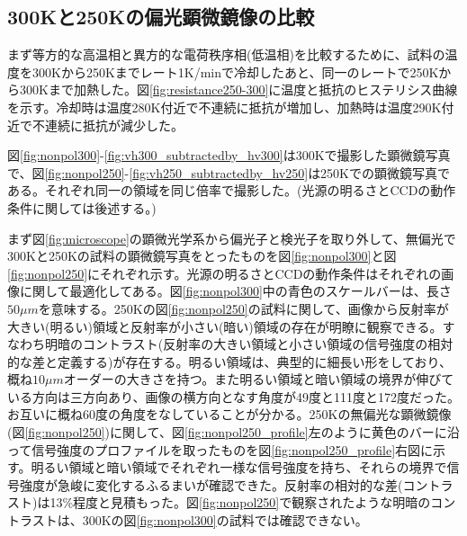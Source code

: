 \documentclass[11pt,a4paper]{jsarticle}
\begin{document}
\subsection{300Kと250Kの偏光顕微鏡像の比較}
まず等方的な高温相と異方的な電荷秩序相(低温相)を比較するために、試料の温度を300Kから250Kまでレート1K/minで冷却したあと、同一のレートで250Kから300Kまで加熱した。図\ref{fig:resistance250-300}に温度と抵抗のヒステリシス曲線を示す。冷却時は温度280K付近で不連続に抵抗が増加し、加熱時は温度290K付近で不連続に抵抗が減少した。

図\ref{fig:nonpol300}-\ref{fig:vh300_subtractedby_hv300}は300Kで撮影した顕微鏡写真で、図\ref{fig:nonpol250}-\ref{fig:vh250_subtractedby_hv250}は250Kでの顕微鏡写真である。それぞれ同一の領域を同じ倍率で撮影した。(光源の明るさとCCDの動作条件に関しては後述する。)

まず図\ref{fig:microscope}の顕微光学系から偏光子と検光子を取り外して、無偏光で300Kと250Kの試料の顕微鏡写真をとったものを図\ref{fig:nonpol300}と図\ref{fig:nonpol250}にそれぞれ示す。光源の明るさとCCDの動作条件はそれぞれの画像に関して最適化してある。図\ref{fig:nonpol300}中の青色のスケールバーは、長さ$50 \mu m$を意味する。250Kの図\ref{fig:nonpol250}の試料に関して、画像から反射率が大きい(明るい)領域と反射率が小さい(暗い)領域の存在が明瞭に観察できる。すなわち明暗のコントラスト(反射率の大きい領域と小さい領域の信号強度の相対的な差と定義する)が存在する。明るい領域は、典型的に細長い形をしており、概ね$10 \mu m$オーダーの大きさを持つ。また明るい領域と暗い領域の境界が伸びている方向は三方向あり、画像の横方向となす角度が49度と111度と172度だった。お互いに概ね60度の角度をなしていることが分かる。250Kの無偏光な顕微鏡像(図\ref{fig:nonpol250})に関して、図\ref{fig:nonpol250_profile}左のように黄色のバーに沿って信号強度のプロファイルを取ったものを図\ref{fig:nonpol250_profile}右図に示す。明るい領域と暗い領域でそれぞれ一様な信号強度を持ち、それらの境界で信号強度が急峻に変化するふるまいが確認できた。反射率の相対的な差(コントラスト)は13\%程度と見積もった。図\ref{fig:nonpol250}で観察されたような明暗のコントラストは、300Kの図\ref{fig:nonpol300}の試料では確認できない。
\end{document}
